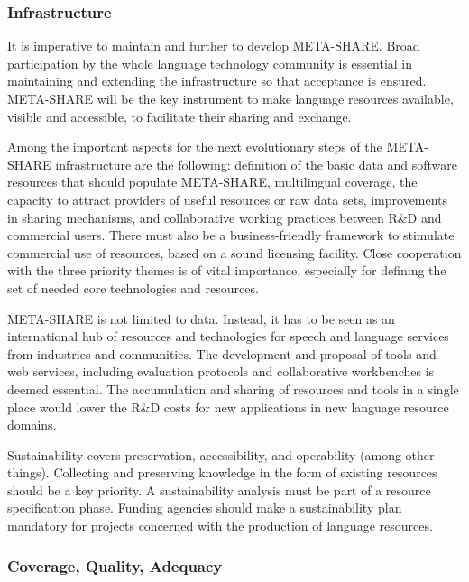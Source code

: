 \documentclass[10pt, plain]{../../metanetpaper}
\begin{document}
\begin{multicols}{2}
\subsubsection{Infrastructure}
\label{sec:infrastructure}

It is imperative to maintain and further to develop META-SHARE. Broad participation by the whole language technology community is essential in maintaining and extending the infrastructure so that acceptance is ensured. META-SHARE will be the key instrument to make language resources available, visible and accessible, to facilitate their sharing and exchange.

Among the important aspects for the next evolutionary steps of the META-SHARE infrastructure are the following: definition of the basic data and software resources that should populate META-SHARE, multilingual coverage, the capacity to attract providers of useful resources or raw data sets, improvements in sharing mechanisms, and collaborative working practices between R\&D and commercial users. There must also be a business-friendly framework to stimulate commercial use of resources, based on a sound licensing facility. Close cooperation with the three priority themes is of vital importance, especially for defining the set of needed core technologies and resources.

META-SHARE is not limited to data. Instead, it has to be seen as an international hub of resources and technologies for speech and language services from industries and communities. The development and proposal of tools and web services, including evaluation protocols and collaborative workbenches is deemed essential. The accumulation and sharing of resources and tools in a single place would lower the R\&D costs for new applications in new language resource domains.

Sustainability covers preservation, accessibility, and operability (among other things). Collecting and preserving knowledge in the form of existing resources should be a key priority. A sustainability analysis must be part of a resource specification phase. Funding agencies should make a sustainability plan mandatory for projects concerned with the production of language resources.

\subsubsection{Coverage, Quality, Adequacy}
\label{sec:cover-qual-adeq}


\end{multicols}
\end{document}
